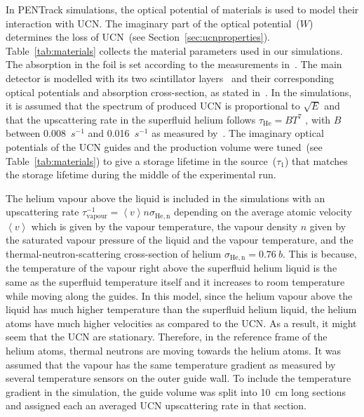 


In PENTrack simulations, the optical potential of materials is used to
model their interaction with UCN. The imaginary part of the optical
potential~($W$) determines the loss of UCN~(see
Section~\ref{sec:ucnproperties}). Table~\ref{tab:materials} collects
the material parameters used in our simulations. The absorption in the
foil is set according to the measurements
in~\cite{atchison2009transmission}. The main detector is modelled with
its two scintillator layers~\cite{jamieson2017characterization} and
their corresponding optical potentials and absorption cross-section,
as stated in~\cite{Ban2016}. In the simulations, it is assumed that
the spectrum of produced UCN is proportional to $\sqrt{E}$ and that
the upscattering rate in the superfluid helium follows
$\tau_\mathrm{He} = B T^7$ , with $B$ between 0.008~$s^{-1}$ and
0.016~$s^{-1}$ as measured by~\cite{Leung2016}. The imaginary optical
potentials of the UCN guides and the production volume were tuned~(see
Table~\ref{tab:materials}) to give a storage lifetime in the
source~($\tau_1$) that matches the storage lifetime during the middle
of the experimental run.


The helium vapour above the liquid is included in the simulations with
an upscattering rate
$\tau^{-1}_\mathrm{vapour} = \left< v \right> n \sigma_\mathrm{He,n}$
depending on the average atomic velocity $\left < v \right>$ which is
given by the vapour temperature, the vapour density $n$ given by the
saturated vapour pressure of the liquid and the vapour temperature,
and the thermal-neutron-scattering cross-section of helium
$\sigma_\mathrm{He,n} = 0.76~b$. This is because, the temperature of
the vapour right above the superfluid helium liquid is the same as the
superfluid temperature itself and it increases to room temperature
while moving along the guides. In this model, since the helium vapour
above the liquid has much higher temperature than the superfluid
helium liquid, the helium atoms have much higher velocities as
compared to the UCN. As a result, it might seem that the UCN are
stationary. Therefore, in the reference frame of the helium atoms,
thermal neutrons are moving towards the helium atoms.  It was assumed
that the vapour has the same temperature gradient as measured by
several temperature sensors on the outer guide wall. To include the
temperature gradient in the simulation, the guide volume was split
into 10~cm long sections and assigned each an averaged UCN
upscattering rate in that section.


